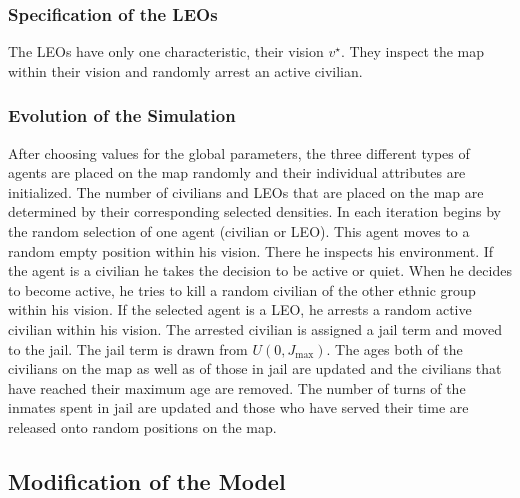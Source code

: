 \documentclass[11pt]{article}
\begin{document}
\subsubsection{Specification of the LEOs}
The LEOs have only one characteristic, their vision $v^\star$. They inspect the map within their vision and randomly arrest an active civilian.

\subsubsection{Evolution of the Simulation}
After choosing values for the global parameters, the three different types of agents are placed on the map randomly and their individual attributes are initialized. The number of civilians and LEOs that are placed on the map are determined by their corresponding selected densities. In each iteration begins by the random selection of one agent (civilian or LEO). This agent moves to a random empty position within his vision. There he inspects his environment. If the agent is a civilian he takes the decision to be active or quiet. When he decides to become active, he tries to kill a random civilian of the other ethnic group within his vision. If the selected agent is a LEO, he arrests a random active civilian within his vision. The arrested civilian is assigned a jail term and moved to the jail. The jail term is drawn from $U(0,J_{\text{max}})$. The ages both of the civilians on the map as well as of those in jail are updated and the civilians that have reached their maximum age are removed. The number of turns of the inmates spent in jail are updated and those who have served their time are released onto random positions on the map.

\subsection{Modification of the Model}
\end{document}
